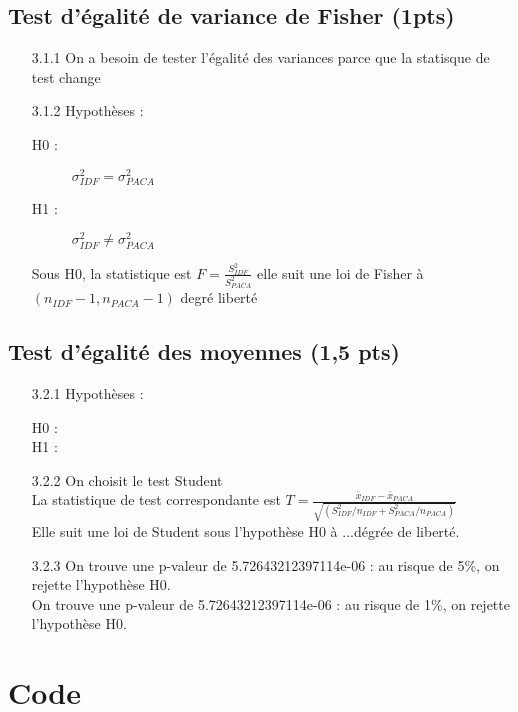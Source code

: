 \documentclass{article}
\begin{document}
\subsection{Test d'égalité de variance de Fisher (1pts)} 
\begin{itemize}
\item [3.1.1]On a besoin de tester l'égalité des variances parce que la statisque de test change

\item [3.1.2] Hypothèses : 
\begin{description}
	\item[H0 :]  $\sigma^2_{IDF}=\sigma^2_{PACA}$ 
	\item[H1 :] $\sigma^2_{IDF} \neq \sigma^2_{PACA}$
\end{description}
Sous H0, la statistique est  $F = \frac{S^2_{IDF}}{S^2_{PACA}}$ elle suit une loi de  Fisher à  $(n_{IDF}-1,n_{PACA}-1)$ degré liberté \\

\end{itemize}
\vspace{3mm}


\subsection{Test d'égalité des moyennes (1,5 pts)}

\begin{itemize}
	\item [3.2.1]
Hypothèses : 
\begin{description}
    \item[H0 :]
    \item[H1 :]
\end{description}
\item[3.2.2]
On choisit le test Student \\
La statistique de test correspondante est  
$ T = \frac {\bar{x}_{IDF}-\bar{x}_{PACA}}{\sqrt{(S^2_{IDF}/n_{IDF} +S^2_{PACA}/n_{PACA})}} $\\
Elle suit une loi de  Student sous l'hypothèse H0 à ...dégrée de liberté.\\
\item[3.2.3]
On trouve une p-valeur de 5.72643212397114e-06  : au risque de 5\%, on rejette l'hypothèse H0.\\

On trouve une p-valeur de 5.72643212397114e-06 : au risque de 1\%, on rejette l'hypothèse H0.\\
\end{itemize}

\newpage
\appendix

\section{Code}
%
\end{document}
